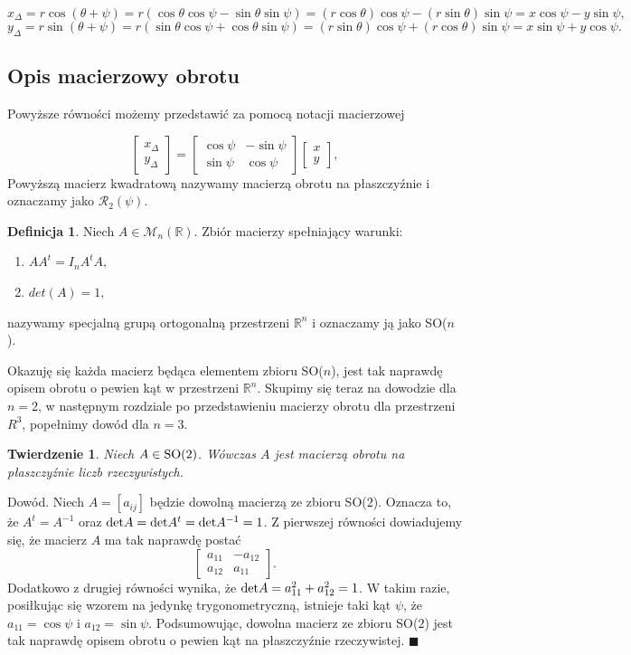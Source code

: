 \documentclass[a4paper,twoside,11pt,reqno]{mwrep}
\theoremstyle{plain} \newtheorem{twr}{Twierdzenie}
\theoremstyle{plain} \newtheorem{lem}{Lemat}
\theoremstyle{definition} \newtheorem{defi}{Definicja}
\theoremstyle{remark} \newtheorem*{wni}{Wniosek}
\theoremstyle{definition} \newtheorem{uwaga}{Uwaga}
\theoremstyle{definition}\newtheorem{prz}{Przykład}
\newenvironment{dowod}{\par\vspace{0.1cm}\par{\sc Dowód.}}{\hfill $\blacksquare$\par\vspace{0.4cm}\par}
\begin{document}
$$x_\Delta=r\cos(\theta +\psi) =
r(\cos\theta \cos\psi - \sin \theta \sin \psi)=(r\cos\theta) \cos\psi -
(r\sin \theta) \sin \psi = x \cos\psi - y\sin \psi,$$
$$y_\Delta=r\sin(\theta +\psi)= r(\sin \theta \cos \psi +
\cos\theta \sin\psi) = (r\sin \theta) \cos \psi +
(r\cos\theta) \sin\psi  = x\sin\psi +y\cos\psi . $$

\subsection{Opis macierzowy obrotu}\label{SO(2)}
Powyższe równości możemy przedstawić za pomocą notacji macierzowej

$$
\begin{bmatrix}
x_\Delta\\
y_\Delta
\end{bmatrix} =
\begin{bmatrix}
\cos\psi   & -\sin\psi \\
\sin\psi & \cos\psi  
\end{bmatrix}
\begin{bmatrix}
x \\
y 
\end{bmatrix},
$$
Powyższą macierz kwadratową nazywamy macierzą obrotu na płaszczyźnie i oznaczamy jako
$\mathcal{R}_2(\psi)$.

\begin{defi}
Niech $A\in\mathcal{M}_n(\mathbb{R})$. Zbiór macierzy spełniający warunki:
\begin{enumerate}
	\item $ AA^t=I_n  A^tA,$
	\item $ det(A)=1,$
\end{enumerate}
nazywamy specjalną grupą ortogonalną przestrzeni $\mathbb{R}^n$ i oznaczamy ją jako 
SO($n$).
\end{defi}

Okazuję się każda macierz będąca elementem zbioru SO($n$), jest tak naprawdę opisem 
obrotu o pewien kąt w przestrzeni $\mathbb{R}^n$. Skupimy się teraz na dowodzie dla $n=2$,
w następnym rozdziale po przedstawieniu macierzy obrotu dla przestrzeni $R^3$, 
popełnimy dowód dla $n=3$.
\begin{twr}\label{rotationMatrixSO(2)}
Niech $A\in\textup{SO}(2)$. Wówczas $A$ jest macierzą obrotu na płaszczyźnie liczb rzeczywistych.
\end{twr}
\begin{dowod}
Niech $A=[a_{ij}]$ będzie dowolną macierzą ze zbioru SO($2$).
Oznacza to, że $A^t = A^{-1}$ oraz $\textup{det}A=\textup{det}A^t=\textup{det}A^{-1}=1$.
Z pierwszej równości dowiadujemy się, że macierz $A$ ma tak naprawdę postać
$$\begin{bmatrix}
a_{11}&-a_{12} \\
a_{12} & a_{11}
\end{bmatrix}.$$
Dodatkowo z drugiej równości wynika, że $\textup{det}A = a^2_{11}+a^2_{12}=1$.
W takim razie, posiłkując się wzorem na jedynkę trygonometryczną,
istnieje taki kąt $\psi$, że  $a_{11}=\cos\psi$ i $a_{12}=\sin\psi$.
Podsumowując, dowolna macierz ze zbioru SO($2$) jest tak naprawdę
opisem obrotu o pewien kąt na płaszczyźnie rzeczywistej.
\end{dowod}
\end{document}
